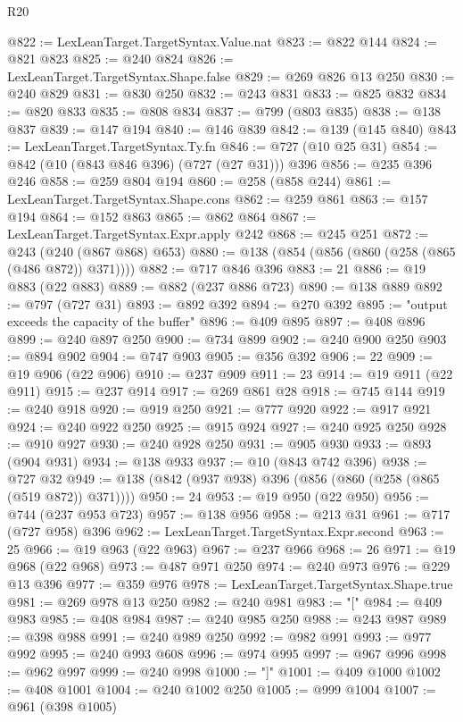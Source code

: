 \begin{lexlean}{R20}
\begin{coremodule}
@822 := LexLeanTarget.TargetSyntax.Value.nat
@823 := @822 @144
@824 := @821 @823
@825 := @240 @824
@826 := LexLeanTarget.TargetSyntax.Shape.false
@829 := @269 @826 @13 @250
@830 := @240 @829
@831 := @830 @250
@832 := @243 @831
@833 := @825 @832
@834 := @820 @833
@835 := @808 @834
@837 := @799 (@803 @835)
@838 := @138 @837
@839 := @147 @194
@840 := @146 @839
@842 := @139 (@145 @840)
@843 := LexLeanTarget.TargetSyntax.Ty.fn
@846 := @727 (@10 @25 @31)
@854 := @842 (@10 (@843 @846 @396) (@727 (@27 @31))) @396
@856 := @235 @396 @246
@858 := @259 @804 @194
@860 := @258 (@858 @244)
@861 := LexLeanTarget.TargetSyntax.Shape.cons
@862 := @259 @861
@863 := @157 @194
@864 := @152 @863
@865 := @862 @864
@867 := LexLeanTarget.TargetSyntax.Expr.apply @242
@868 := @245 @251
@872 := @243 (@240 (@867 @868) @653)
@880 := @138 (@854 (@856 (@860 (@258 (@865 (@486 @872)) @371))))
@882 := @717 @846 @396
@883 := 21
@886 := @19 @883 (@22 @883)
@889 := @882 (@237 @886 @723)
@890 := @138 @889
@892 := @797 (@727 @31)
@893 := @892 @392
@894 := @270 @392
@895 := "output exceeds the capacity of the buffer"
@896 := @409 @895
@897 := @408 @896
@899 := @240 @897 @250
@900 := @734 @899
@902 := @240 @900 @250
@903 := @894 @902
@904 := @747 @903
@905 := @356 @392
@906 := 22
@909 := @19 @906 (@22 @906)
@910 := @237 @909
@911 := 23
@914 := @19 @911 (@22 @911)
@915 := @237 @914
@917 := @269 @861 @28
@918 := @745 @144
@919 := @240 @918
@920 := @919 @250
@921 := @777 @920
@922 := @917 @921
@924 := @240 @922 @250
@925 := @915 @924
@927 := @240 @925 @250
@928 := @910 @927
@930 := @240 @928 @250
@931 := @905 @930
@933 := @893 (@904 @931)
@934 := @138 @933
@937 := @10 (@843 @742 @396)
@938 := @727 @32
@949 := @138 (@842 (@937 @938) @396 (@856 (@860 (@258 (@865 (@519 @872)) @371))))
@950 := 24
@953 := @19 @950 (@22 @950)
@956 := @744 (@237 @953 @723)
@957 := @138 @956
@958 := @213 @31
@961 := @717 (@727 @958) @396
@962 := LexLeanTarget.TargetSyntax.Expr.second
@963 := 25
@966 := @19 @963 (@22 @963)
@967 := @237 @966
@968 := 26
@971 := @19 @968 (@22 @968)
@973 := @487 @971 @250
@974 := @240 @973
@976 := @229 @13 @396
@977 := @359 @976
@978 := LexLeanTarget.TargetSyntax.Shape.true
@981 := @269 @978 @13 @250
@982 := @240 @981
@983 := "["
@984 := @409 @983
@985 := @408 @984
@987 := @240 @985 @250
@988 := @243 @987
@989 := @398 @988
@991 := @240 @989 @250
@992 := @982 @991
@993 := @977 @992
@995 := @240 @993 @608
@996 := @974 @995
@997 := @967 @996
@998 := @962 @997
@999 := @240 @998
@1000 := "]"
@1001 := @409 @1000
@1002 := @408 @1001
@1004 := @240 @1002 @250
@1005 := @999 @1004
@1007 := @961 (@398 @1005)

\end{coremodule}
\end{lexlean}
